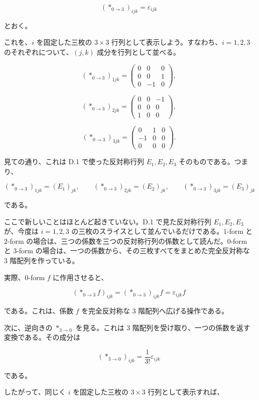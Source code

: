 \documentclass[a4paper,12pt,openany]{book}
\begin{document}
\[
(\ast_{0\to3})_{ijk}
=
\varepsilon_{ijk}
\]

とおく。

これを、\(i\) を固定した三枚の \(3\times3\)
行列として表示しよう。すなわち、\(i=1,2,3\)
のそれぞれについて、\((j,k)\) 成分を行列として並べる。

\[
(\ast_{0\to3})_{1jk}
=
\begin{pmatrix}
0&0&0\\
0&0&1\\
0&-1&0
\end{pmatrix},
\]

\[
(\ast_{0\to3})_{2jk}
=
\begin{pmatrix}
0&0&-1\\
0&0&0\\
1&0&0
\end{pmatrix},
\]

\[
(\ast_{0\to3})_{3jk}
=
\begin{pmatrix}
0&1&0\\
-1&0&0\\
0&0&0
\end{pmatrix}.
\]

見ての通り、これは D.1 で使った反対称行列 \(E_1,E_2,E_3\)
そのものである。つまり、

\[
(\ast_{0\to3})_{1jk}= (E_1)_{jk},
\qquad
(\ast_{0\to3})_{2jk}= (E_2)_{jk},
\qquad
(\ast_{0\to3})_{3jk}= (E_3)_{jk}
\]

である。

ここで新しいことはほとんど起きていない。D.1 で見た反対称行列
\(E_1,E_2,E_3\) が、今度は \(i=1,2,3\)
の三枚のスライスとして並んでいるだけである。\(1\)-form と \(2\)-form
の場合は、三つの係数を三つの反対称行列の係数として読んだ。\(0\)-form と
\(3\)-form
の場合は、一つの係数から、その三枚すべてをまとめた完全反対称な \(3\)
階配列を作っている。

実際、\(0\)-form \(f\) に作用させると、

\[
(\ast_{0\to3}f)_{ijk}
=
(\ast_{0\to3})_{ijk}f
=
\varepsilon_{ijk}f
\]

である。これは、係数 \(f\) を完全反対称な \(3\)
階配列へ広げる操作である。

次に、逆向きの \(\ast_{3\to0}\) を見る。これは \(3\)
階配列を受け取り、一つの係数を返す変換である。その成分は

\[
(\ast_{3\to0})_{ijk}
=
\frac{1}{3!}\varepsilon_{ijk}
\]

である。

したがって、同じく \(i\) を固定した三枚の \(3\times3\)
行列として表示すれば、
\end{document}
